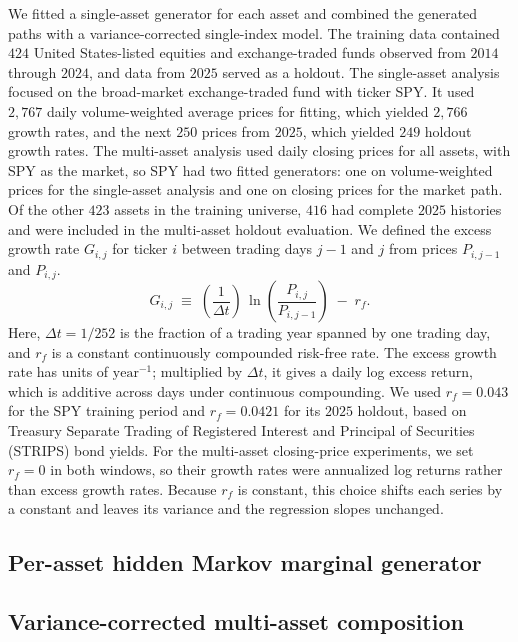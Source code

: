 \documentclass[preprint,authoryear,doubleblind]{elsarticle}
\begin{document}
We fitted a single-asset generator for each asset and combined the generated paths with a variance-corrected single-index model. The training data contained $424$ United States-listed equities and
exchange-traded funds observed from $2014$ through $2024$, and data
from $2025$ served as a holdout. The
single-asset analysis focused on the broad-market exchange-traded fund
with ticker SPY. It used
$2{,}767$ daily volume-weighted average prices for fitting, which
yielded $2{,}766$ growth rates, and the next $250$ prices from $2025$,
which yielded $249$ holdout growth rates. The multi-asset analysis used daily closing prices for all assets,
with SPY as the market, so SPY had two fitted generators: one on
volume-weighted prices for the single-asset analysis and one on
closing prices for the market path. Of
the other $423$ assets in the training universe, $416$ had complete
$2025$ histories and were included in the multi-asset holdout
evaluation. We defined the excess growth rate
$G_{i,j}$ for ticker $i$ between trading days $j-1$ and $j$ from prices
$P_{i,j-1}$ and $P_{i,j}$.
\begin{equation}
    G_{i,j} \;\equiv\; \left(\frac{1}{\Delta t}\right)\,
    \ln\!\left( \frac{P_{i,j}}{P_{i,j-1}} \right) \;-\; r_f.
    \label{eq:growth_rate}
\end{equation}
Here, $\Delta t = 1/252$ is the fraction of a trading year spanned by
one trading day, and $r_f$ is a constant continuously compounded
risk-free rate. The excess growth rate has units of
$\mathrm{year}^{-1}$; multiplied by $\Delta t$, it gives a daily log
excess return, which is additive across days under continuous
compounding. We used $r_f=0.043$ for the SPY training period and
$r_f=0.0421$ for its $2025$ holdout, based on Treasury Separate Trading
of Registered Interest and Principal of Securities (STRIPS) bond yields.
For the multi-asset closing-price experiments, we set $r_f=0$ in both
windows, so their growth rates were annualized log returns rather than excess
growth rates. Because
$r_f$ is constant, this choice shifts each series by a constant and leaves its variance
and the regression slopes unchanged.

\subsection{Per-asset hidden Markov marginal generator}\label{sec:method-hmm}


\subsection{Variance-corrected multi-asset composition}\label{sec:method-sim}

\end{document}
